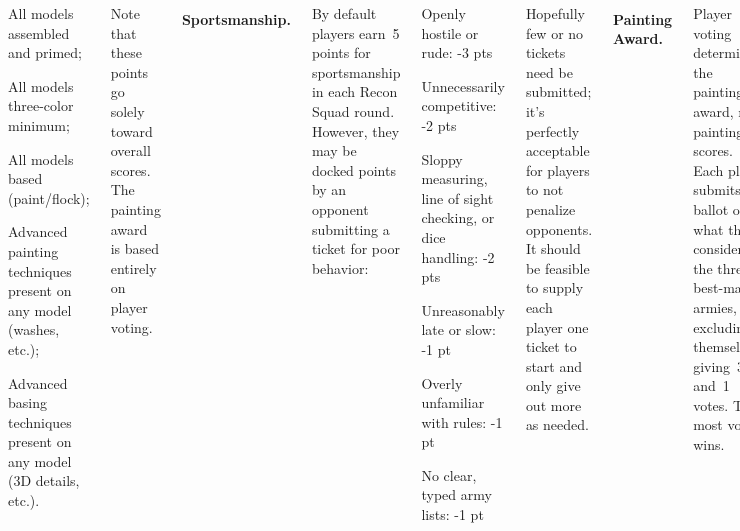 \begin{columns}
\begin{squishitemize}
\item All models assembled and primed;
\item All models three-color minimum;
\item All models based (paint/flock);
\item Advanced painting techniques present on any model (washes,
  etc.);
\item Advanced basing techniques present on any model (3D details,
  etc.).
\end{squishitemize}

Note that these points go solely toward overall scores.  The painting
award is based entirely on player voting.




\paragraph{Sportsmanship.}

By default players earn~5 points for sportsmanship in each Recon Squad
round.  However, they may be docked points by an opponent submitting a
ticket for poor behavior:

\begin{squishitemize}\setlength{\parskip}{0pt}\setlength{\itemsep}{2pt}
\item Openly hostile or rude: \hfill -3 pts
\item Unnecessarily competitive: \hfill -2 pts
\item Sloppy measuring, line of sight checking, or dice handling: \hfill -2 pts
\item Unreasonably late or slow: \hfill -1 pt
\item Overly unfamiliar with rules:
  \hfill -1 pt
\item No clear, typed army lists: \hfill -1 pt
\end{squishitemize}

Hopefully few or no tickets need be submitted; it's perfectly
acceptable for players to not penalize opponents.  It should be
feasible to supply each player one ticket to start and only give out
more as needed.

\paragraph{Painting Award.}  
Player voting determines the painting award, not painting scores.
Each player submits a ballot of what they consider the three best-made
armies, excluding themselves, giving~3,~2, and~1 votes.  The most
votes wins.

\end{columns}


